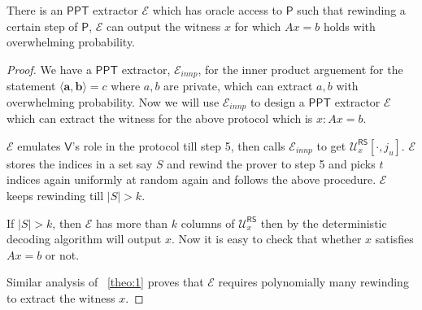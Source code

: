 \documentclass[runningheads]{llncs}
\newcommand{\innp}[2]{\langle #1,#2\rangle}
\def\ppt{\mathsf{PPT}}
\def\extrac{\mathcal{E}}
\def\prover{\mathsf{P}}
\def\verifier{\mathsf{V}}
\def\RS{\mathsf{RS}} %
\def\calU{\mathcal{U}}
\begin{document}
	\begin{theorem}
	 There is an $\ppt$ extractor $\extrac$ which has oracle access to $\prover$ such that rewinding a certain step of $\prover$, $\extrac$ can output the witness $x$ for which $Ax=b$ holds with overwhelming probability.
	\end{theorem}
	\begin{proof}
	We have a $\ppt$ extractor, $\extrac_{innp}$, for the inner product arguement for the statement $\innp{\bm{a}}{\bm{b}}=c$ where $a,b$ are private, which can extract $a, b$ with overwhelming probability. Now we will use $\extrac_{innp}$ to design a $\ppt$ extractor $\extrac$ which can extract the witness for the above protocol which is $x : Ax=b$.
	
	 $\extrac$ emulates $\verifier$'s role in the protocol till step 5, then calls $\extrac_{innp}$ to get $\calU^{\RS}_x[\cdot,j_u]$. $\extrac$ stores the indices in a set say $S$ and rewind the prover to step 5 and picks $t$ indices again uniformly at random again and follows the above procedure. $\extrac$ keeps rewinding till $|S|>k$.
	 
	 If $|S|>k$, then $\extrac$ has more than $k$ columns of $\calU^{\RS}_x$ then by the deterministic decoding algorithm will output $x$. Now it is easy to check that whether $x$ satisfies $Ax=b$ or not. 
	 
	 Similar analysis of ~\ref{theo:1} proves that $\extrac$ requires polynomially many rewinding to extract the witness $x$.
	\end{proof}
\end{document}
